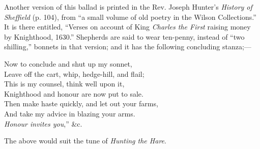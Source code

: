 Another version of this ballad is printed in the Rev. Joseph Hunter’s \textit{History
of Sheffield} (p. 104), from “a small volume of old poetry in the Wilson Collections.”
It is there entitled, “Verses on account of King \textit{Charles the First} raising
money by Knighthood, 1630.” Shepherds are said to wear ten-penny, instead of
“two shilling,” bonnets in that version; and it has the following concluding
stanza;—
\settowidth{\versewidth}{Now to conclude and shut up my sonnet,}
\begin{scverse}
\begin{altverse}
Now to conclude and shut up my sonnet,\\
Leave off the cart, whip, hedge-hill, and flail;\\
This is my counsel, think well upon it,\\
Knighthood and honour are now put to sale.\\
Then make haste quickly, and let out your farms,\\
And take my advice in blazing your arms.\\
\vin\vin\vin \textit{Honour invites you},” \&c.
\end{altverse}
\end{scverse}

The above would suit the tune of \textit{Hunting the Hare}.



